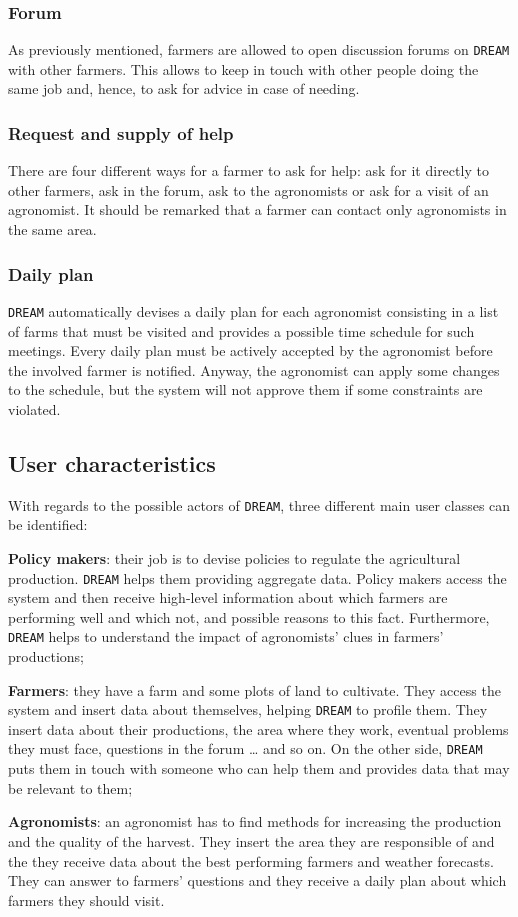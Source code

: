 \documentclass{article}
\begin{document}
\subsubsection{Forum}
As previously mentioned, farmers are allowed to open discussion forums on \verb|DREAM| with other farmers. 
This allows to keep in touch with other people doing the same job and, hence, to ask for advice in case of 
needing.
\subsubsection{Request and supply of help}
There are four different ways for a farmer to ask for help: ask for it directly to other farmers, ask in the forum, ask to
the agronomists or ask for a visit of an agronomist. It should be remarked that a farmer can contact only 
agronomists in the same area.
\subsubsection{Daily plan}
\verb|DREAM| automatically devises a daily plan for each agronomist consisting in a list of farms that must be visited and provides a possible time schedule for such meetings. Every daily plan must be actively accepted 
by the agronomist before the involved farmer is notified. Anyway, the agronomist can apply some changes 
to the schedule, but the system will not approve them if some constraints are violated.
\subsection{User characteristics}
With regards to the possible actors of \verb|DREAM|, three different main user classes can be identified:
\begin{description}
\item \textbf{Policy makers}: their job is to devise policies to regulate the agricultural production. \verb|DREAM| helps 
them providing aggregate data. Policy makers access the system and then receive high-level 
information about which farmers are performing well and which not, and possible reasons to this 
fact. Furthermore, \verb|DREAM| helps to understand the impact of agronomists’ clues in farmers’ 
productions;
\item \textbf{Farmers}: they have a farm and some plots of land to cultivate. They access the system and insert 
data about themselves, helping \verb|DREAM| to profile them. They insert data about their productions, 
the area where they work, eventual problems they must face, questions in the forum … and so on. 
On the other side, \verb|DREAM| puts them in touch with someone who can help them and provides data 
that may be relevant to them;
\item \textbf{Agronomists}: an agronomist has to find methods for increasing the production and the quality of 
the harvest. They insert the area they are responsible of and the they receive data about the best 
performing farmers and weather forecasts. They can answer to farmers’ questions and they receive 
a daily plan about which farmers they should visit.
\end{description}
\end{document}
